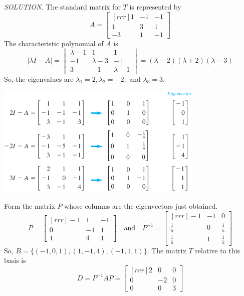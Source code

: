 \documentclass{article}
\begin{document}
    \textit{\textcolor{blue5}{SOLUTION.}} The standard matrix for $T$ is represented by
    \[A = \begin{bmatrix}[rrr]
        1 & -1 & -1\\
        1 & 3 & 1 \\
        -3 & 1 & -1
    \end{bmatrix}\]
    The characteristic polynomial of $A$ is
    \[| \lambda I - A| = \begin{vmatrix}
        \lambda  - 1 & 1 & 1 \\
        -1 & \lambda  - 3 & -1 \\
        3 & -1 & \lambda + 1
    \end{vmatrix} = ( \lambda  -2 )( \lambda  + 2 )( \lambda - 3 )\]
    So, the eigenvalues are $ \lambda _1 = 2, \lambda _2 = -2,$ and $ \lambda _3 = 3$.
    \begin{center}
        \includegraphics[width = 10cm]{images/unknown.png}
    \end{center}
    Form the matrix $P$ whose columns are the eigenvectors just obtained.
    \[P = \begin{bmatrix}[rrr]
        -1 & 1 & -1\\
        0 & -1 & 1\\
        1 & 4 & 1
    \end{bmatrix} \quad \text{and} \quad P^{-1} = \begin{bmatrix}[rrr]
        -1 & -1 & 0 \\
        \frac{1}{5} & 0 & \frac{1}{5} \\
        \frac{1}{5} & 1 & \frac{1}{5}
    \end{bmatrix}  \]
    So, $B = \{(-1,0,1), (1,-1,4),(-1,1,1) \}$. The matrix $T$ relative to this basis is
    \[D = P^{-1}AP = \begin{bmatrix}[rrr]
        2 & 0 & 0 \\
        0 & -2 & 0 \\
        0 & 0 & 3
    \end{bmatrix} \]
\end{document}
